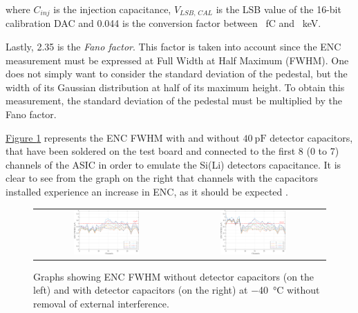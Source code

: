 \noindent
where $C_{\textit{inj}}$ is the injection capacitance, $V_{\textit{LSB, CAL}}$ is the LSB value of the 16-bit calibration DAC and \SI{0.044}{} is the conversion factor between \SI{}{fC} and \SI{}{\kilo\electronvolt}.

\par
Lastly, 2.35 is the \textit{Fano factor}. This factor is taken into account since the ENC measurement must be expressed at Full Width at Half Maximum (FWHM). One does not simply want to consider the standard deviation of the pedestal, but the width of its Gaussian distribution at half of its maximum height. To obtain this measurement, the standard deviation of the pedestal must be multiplied by the Fano factor.

\par
\hyperref[figENCnormal]{Figure \ref{figENCnormal}} represents the ENC FWHM with and without $\SI{40}{\pico\farad}$ detector capacitors, that have been soldered on the test board and connected to the first 8 (0 to 7) channels of the ASIC in order to emulate the Si(Li) detectors capacitance. It is clear to see from the graph on the right that channels with the capacitors installed experience an increase in ENC, as it should be expected \cite{iakovidis_2018_vmm}.

\begin{figure}[ht]
    \centering
    \begin{tabular}{cc}
         \includegraphics[width=0.475\textwidth]{Images/chap1/results/ENC_minus40C/ASIC_cold_wocaps_normal.pdf} &  \includegraphics[width=0.475\textwidth]{Images/chap1/results/ENC_minus40C/ASIC_cold_wcaps_normal.pdf} \\
    \end{tabular}
    \caption{Graphs showing ENC FWHM without detector capacitors (on the left) and with detector capacitors (on the right) at \SI{-40}{\celsius} without removal of external interference.}
    \label{figENCnormal}
\end{figure}

